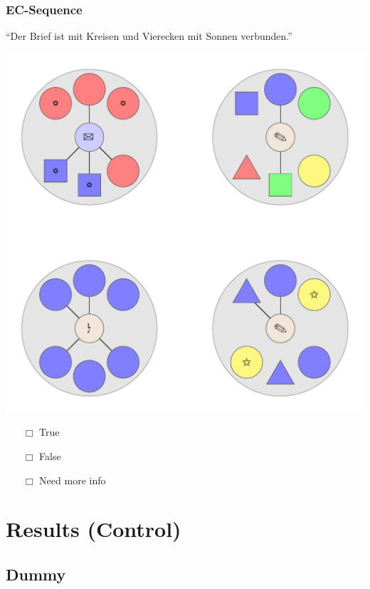 \documentclass[fleqn,10pt,xcolor=dvipsnames]{beamer}
\newcommand{\EC}{EC\xspace}
\newcommand{\mymark}[1]{{\color{mycol}{#1}}}
\begin{document}
\begin{frame}
  \frametitle{\EC-Sequence}
  \begin{center}
    ``Der Brief ist mit Kreisen und Vierecken mit Sonnen verbunden.''

    \vspace{0.1cm}

    \includegraphics[width=0.5 \textwidth]{../../pictures/ec_01_5.pdf}

    \vspace{0.1cm}

    \begin{multicols}{3}
      \begin{itemize} 
      \item[$\Box$] True\\
        \onslide<2>{$\leadsto$  \mymark{LC}}
      \item[$\Box$] False\\
        \onslide<2>{$\leadsto$ \mymark{false}}
      \item[$\Box$] Need more info 
      \end{itemize}
    \end{multicols}

  \end{center}
\end{frame}

\section{Results (Control)}
\subsection{Dummy}
\end{document}
